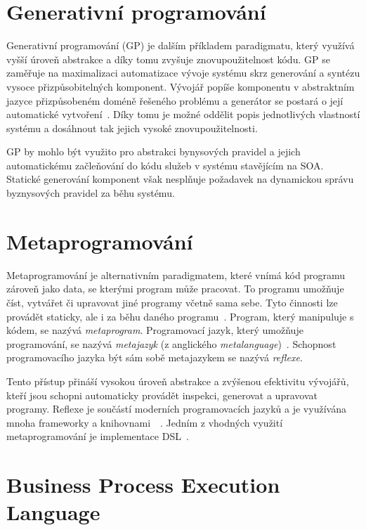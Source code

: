 \section{Generativní programování}

Generativní programování (\gls{GP}) je dalším příkladem paradigmatu, který
využívá vyšší úroveň abstrakce a díky tomu zvyšuje znovupoužitelnost
kódu. \gls{GP} se zaměřuje na maximalizaci automatizace vývoje systému
skrz generování a syntézu vysoce přizpůsobitelných komponent. Vývojář
popíše komponentu v abstraktním jazyce přizpůsobeném doméně řešeného
problému a generátor se postará o její automatické vytvoření~\cite{czarnecki2000generative}.
Díky tomu je možné oddělit popis jednotlivých vlastností systému a dosáhnout tak
jejich vysoké znovupoužitelnosti.

\gls{GP} by mohlo být využito pro abstrakci bynysových pravidel a jejich automatickému
začleňování do kódu služeb v systému stavějícím na \gls{SOA}.
Statické generování komponent však nesplňuje požadavek na dynamickou správu
byznysových pravidel za běhu systému.

\section{Metaprogramování}

Metaprogramování je alternativním paradigmatem, které vnímá kód programu
zároveň jako data, se kterými program může pracovat. To programu umožňuje
číst, vytvářet či upravovat jiné programy včetně sama sebe. Tyto činnosti
lze provádět staticky, ale i za běhu daného programu~\cite{sheard2001accomplishments}\cite{czarnecki2000generative}.
Program, který manipuluje s kódem, se nazývá \textit{metaprogram}. Programovací
jazyk, který umožňuje programování, se nazývá \textit{metajazyk} (z anglického
\textit{metalanguage})~\cite{visser2002meta}. Schopnost programovacího jazyka
být sám sobě metajazykem se nazývá \textit{reflexe}.

Tento přístup přináší vysokou úroveň abstrakce a zvýšenou efektivitu
vývojářů, kteří jsou schopni automaticky provádět inspekci, generovat a upravovat
programy. Reflexe je součástí moderních programovacích jazyků a je
využívána mnoha frameworky a knihovnami~\cite{vandevoorde2002c++}~\cite{forman2004java}.
Jedním z vhodných využití metaprogramování je implementace \gls{DSL}~\cite{sheard2001accomplishments}.

\section{Business Process Execution Language}

